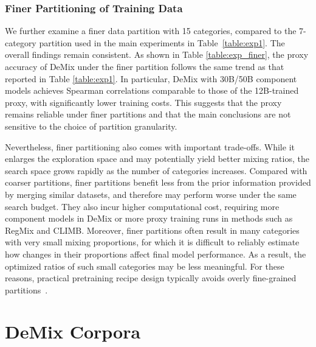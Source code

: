 \documentclass{article}
\theoremstyle{plain}
\theoremstyle{definition}
\theoremstyle{remark}
\begin{document}
\subsubsection{Finer Partitioning of Training Data}

We further examine a finer data partition with 15 categories, compared to the 7-category partition used in the main experiments in Table~\ref{table:exp1}. The overall findings remain consistent. As shown in Table \ref{table:exp_finer}, the proxy accuracy of DeMix under the finer partition follows the same trend as that reported in Table \ref{table:exp1}. In particular, DeMix with 30B/50B component models achieves Spearman correlations comparable to those of the 12B-trained proxy, with significantly lower training costs. This suggests that the proxy remains reliable under finer partitions and that the main conclusions are not sensitive to the choice of partition granularity.

Nevertheless, finer partitioning also comes with important trade-offs. While it enlarges the exploration space and may potentially yield better mixing ratios, the search space grows rapidly as the number of categories increases. Compared with coarser partitions, finer partitions benefit less from the prior information provided by merging similar datasets, and therefore may perform worse under the same search budget. They also incur higher computational cost, requiring more component models in DeMix or more proxy training runs in methods such as RegMix and CLIMB. Moreover, finer partitions often result in many categories with very small mixing proportions, for which it is difficult to reliably estimate how changes in their proportions affect final model performance. As a result, the optimized ratios of such small categories may be less meaningful. For these reasons, practical pretraining recipe design typically avoids overly fine-grained partitions~\cite{feng2024maximize,blakeman2025nemotron}.

\section{DeMix Corpora}
\end{document}
